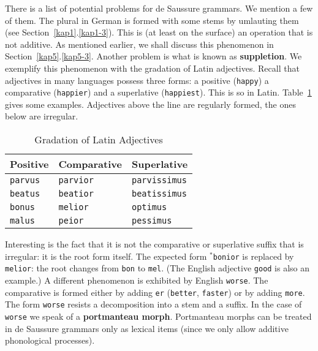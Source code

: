There is a list of potential problems for de Saussure grammars. We
mention a few of them. The plural in German is formed with some
stems by umlauting them (see Section~\ref{kap1}.\ref{kap1-3}). This is 
(at least on the surface) an operation that is not additive. 
As mentioned earlier, we shall discuss this phenomenon in 
Section~\ref{kap5}.\ref{kap5-3}. Another problem is what is known 
as \textbf{suppletion}. 
We exemplify this phenomenon with the gradation of Latin adjectives.
Recall that adjectives in many languages possess three forms: a
positive ({\tt happy}) a comparative ({\tt happier}) and a
superlative ({\tt happiest}). This is so in Latin. 
Table~\ref{tab:gradation} gives some examples. Adjectives above 
the line are regularly formed, the ones below are irregular.
\begin{table}
\caption{Gradation of Latin Adjectives}
\label{tab:gradation}
\begin{center}
\begin{tabular}{lll}
\mbox{\rm Positive} & \mbox{\rm Comparative} & \mbox{\rm Superlative} \\\hline
\mbox{\tt parvus} & \mbox{\tt parvior} & \mbox{\tt parvissimus} \\
\mbox{\tt beatus} & \mbox{\tt beatior} & \mbox{\tt beatissimus} \\\hline
\mbox{\tt bonus}  & \mbox{\tt melior}  & \mbox{\tt optimus} \\
\mbox{\tt malus}  & \mbox{\tt peior}   & \mbox{\tt pessimus} 
\end{tabular}
\end{center}
\end{table}
Interesting is the fact that it is not the comparative or 
superlative suffix that is irregular: it is the root form itself.
The expected form $^{\ast}${\tt bonior} is replaced by {\tt melior}: 
the root changes from {\tt bon} to {\tt mel}. (The English adjective
{\tt good} is also an example.) A different phenomenon is exhibited 
by English {\tt worse}. The comparative is formed either by 
adding {\tt er} ({\tt better}, {\tt faster}) or by adding 
{\tt more}. The form {\tt worse} resists a decomposition into 
a stem and a suffix. In the case of {\tt worse} we speak of a 
\textbf{portmanteau morph}. Portmanteau morphs can be treated in 
de Saussure grammars only as lexical items (since we only allow 
additive phonological processes).  

